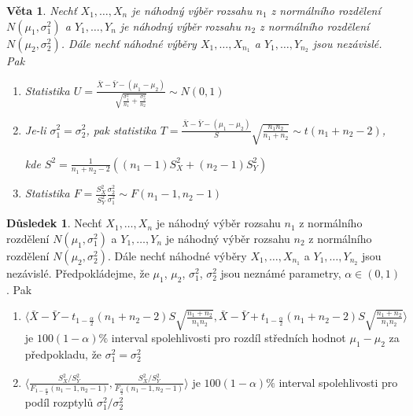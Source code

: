 \documentclass[a4]{report}
\newtheorem{theorem}{Věta}
\theoremstyle{definition}
\newtheorem{dusledek}{Důsledek}[section]
\begin{document}
{\begin{theorem}
Nechť $X_1,\ldots,X_n$ je náhodný výběr rozsahu $n_1$ z normálního rozdělení $N\left(\mu_1,\sigma_{1}^{2} \right)$ a $Y_1,\ldots,Y_n$ je náhodný výběr rozsahu $n_2$ z normálního rozdělení $N\left(\mu_2,\sigma_{2}^{2} \right)$. Dále nechť náhodné výběry $X_1,\ldots,X_{n_1}$ a $Y_1,\ldots,Y_{n_2}$ jsou nezávislé. Pak \begin{enumerate}
\item Statistika $U = \frac{\bar{X}-\bar{Y}-\left(\mu_1 - \mu_2 \right)}{\sqrt{ \frac{\sigma_{1}^{2}}{n_1} +  \frac{\sigma_{2}^{2}}{n_2} }} \sim N\left(0,1 \right)$
\item Je-li $\sigma_{1}^{2} = \sigma_{2}^{2}$, pak statistika $T = \frac{\bar{X}-\bar{Y}-\left(\mu_1 - \mu_2 \right)}{S}\sqrt{\frac{n_1 n_2}{n_1 + n_2}} \sim t \left(n_1 + n_2 -2 \right)$,

kde $S^2 = \frac{1}{n_1 +n_2 -2} \left( \left( n_1 - 1 \right) S_{X}^{2} + \left( n_2 - 1 \right) S_{Y}^{2} \right)$
\item Statistika $F = \frac{S_{X}^{2}}{ S_{Y}^{2}} \frac{\sigma_{2}^{2}}{\sigma_{1}^{2}} \sim F\left(n_1 - 1, n_2 -1 \right)$
\end{enumerate}
\end{theorem}

\begin{dusledek}
Nechť $X_1,\ldots,X_n$ je náhodný výběr rozsahu $n_1$ z normálního rozdělení $N\left(\mu_1,\sigma_{1}^{2} \right)$ a $Y_1,\ldots,Y_n$ je náhodný výběr rozsahu $n_2$ z normálního rozdělení $N\left(\mu_2,\sigma_{2}^{2} \right)$. Dále nechť náhodné výběry $X_1,\ldots,X_{n_1}$ a $Y_1,\ldots,Y_{n_2}$ jsou nezávislé. Předpokládejme, že $\mu_1$, $\mu_2$, $\sigma_{1}^{2}$, $\sigma_{2}^{2}$ jsou neznámé parametry, $\alpha \in \left(0,1\right)$. Pak \begin{enumerate}
\item $\langle \bar{X} - \bar{Y} -  t_{1-\frac{\alpha}{2}} \left(n_1 + n_2 -2 \right) S \sqrt{\frac{n_1 + n_2}{n_1 n_2}}, \bar{X} - \bar{Y} +  t_{1-\frac{\alpha}{2}} \left(n_1 + n_2 -2 \right) S \sqrt{\frac{n_1 + n_2}{n_1 n_2}} \rangle$ je $100\left(1-\alpha \right)\%$ interval spolehlivosti pro rozdíl středních hodnot $\mu_1 - \mu_2$ za předpokladu, že $\sigma_{1}^{2} = \sigma_{2}^{2}$
\item $\langle \frac{ S_{X}^{2}/ S_{Y}^{2}}{F_{1-\frac{\alpha}{2}} \left(n_1 -1, n_2 -1 \right)}, \frac{ S_{X}^{2}/ S_{Y}^{2}}{F_{\frac{\alpha}{2}} \left(n_1 -1, n_2 -1 \right)}   \rangle$ je $100\left(1-\alpha \right)\%$ interval spolehlivosti pro podíl rozptylů $\sigma_{1}^{2} / \sigma_{2}^{2}$
\end{enumerate} 
\end{dusledek}

}
\end{document}
